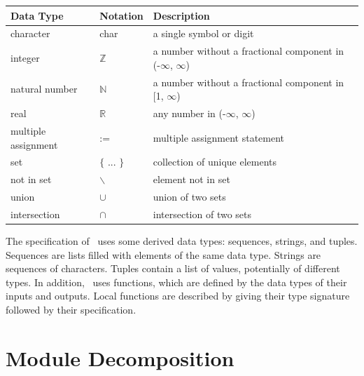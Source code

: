 \documentclass[12pt, titlepage]{article}
\begin{document}
\begin{center}
  \renewcommand{\arraystretch}{1.2}
  \noindent
  \begin{tabular}{l l p{7.5cm}}
    \toprule
    \textbf{Data Type} & \textbf{Notation} & \textbf{Description}                                             \\
    \midrule
    character          & char              & a single symbol or digit                                         \\
    integer            & $\mathbb{Z}$      & a number without a fractional component in (-$\infty$, $\infty$) \\
    natural number     & $\mathbb{N}$      & a number without a fractional component in [1, $\infty$)         \\
    real               & $\mathbb{R}$      & any number in (-$\infty$, $\infty$)                              \\
    multiple assignment & :=                & multiple assignment statement                                    \\
    set               & $\{$ ... $\}$     & collection of unique elements                                    \\
    not in set       & $\backslash$          & element not in set  \\
    union        & $\cup$             & union of two sets                                                \\             
    intersection & $\cap$             & intersection of two sets                                         \\                        
    \bottomrule
  \end{tabular}
\end{center}

\noindent
The specification of \progname \ uses some derived data types: sequences, strings, and
tuples. Sequences are lists filled with elements of the same data type. Strings
are sequences of characters. Tuples contain a list of values, potentially of
different types. In addition, \progname \ uses functions, which
are defined by the data types of their inputs and outputs. Local functions are
described by giving their type signature followed by their specification.

\section{Module Decomposition}
\end{document}

